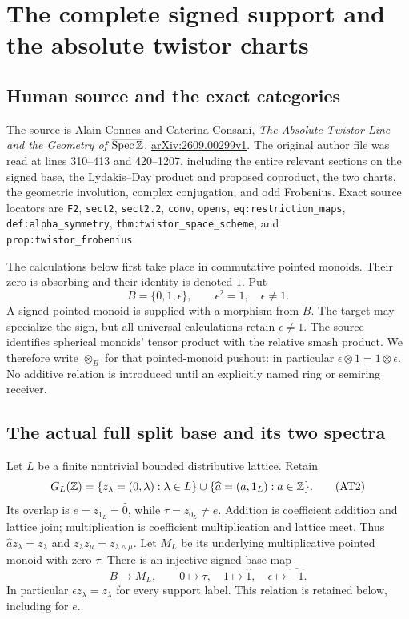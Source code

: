 \section{The complete signed support and the absolute twistor charts}


\subsection{Human source and the exact categories}

The source is Alain Connes and Caterina Consani,
\emph{The Absolute Twistor Line and the Geometry of
$\overline{\operatorname{Spec}\mathbb Z}$},
\href{https://arxiv.org/abs/2609.00299v1}{arXiv:2609.00299v1}.
The original author file  was read at lines
310--413 and 420--1207, including the entire relevant sections on
the signed base, the Lydakis--Day product and proposed coproduct,
the two charts, the geometric involution, complex conjugation,
and odd Frobenius. Exact source locators are
\texttt{F2}, \texttt{sect2}, \texttt{sect2.2}, \texttt{conv},
\texttt{opens}, \texttt{eq:restriction\_maps},
\texttt{def:alpha\_symmetry}, \texttt{thm:twistor\_space\_scheme},
and \texttt{prop:twistor\_frobenius}.

The calculations below first take place in commutative pointed
monoids. Their zero is absorbing and their identity is denoted $1$.
Put
\[
 B=\{0,1,\epsilon\},\qquad\epsilon^2=1,\quad\epsilon\ne1.
 \tag{AT1}\label{at:eq:signed-base}
\]
A signed pointed monoid is supplied with a morphism from $B$.
The target may specialize the sign, but all universal calculations
retain $\epsilon\ne1$. The source identifies spherical monoids'
tensor product with the relative smash product. We therefore write
$\otimes_B$ for that pointed-monoid pushout: in particular
$\epsilon\otimes1=1\otimes\epsilon$. No additive relation is
introduced until an explicitly named ring or semiring receiver.

\subsection{The actual full split base and its two spectra}

Let $L$ be a finite nontrivial bounded distributive lattice. Retain
\[
 G_L(\mathbb Z)=\{z_\lambda=(0,\lambda):\lambda\in L\}
       \cup\{\widehat a=(a,1_L):a\in\mathbb Z\}.
 \tag{AT2}\label{at:eq:full-semiring}
\]
Its overlap is $e=z_{1_L}=\widehat0$, while
$\tau=z_{0_L}\ne e$. Addition is coefficient addition and lattice
join; multiplication is coefficient multiplication and lattice
meet. Thus $\widehat a z_\lambda=z_\lambda$ and
$z_\lambda z_\mu=z_{\lambda\wedge\mu}$. Let $M_L$ be its
underlying multiplicative pointed monoid with zero $\tau$.
There is an injective signed-base map
\[
 B\longrightarrow M_L,
 \qquad 0\mapsto\tau,\quad1\mapsto\widehat1,
 \quad\epsilon\mapsto\widehat{-1}.
 \tag{AT3}\label{at:eq:base-map}
\]
In particular $\epsilon z_\lambda=z_\lambda$ for every support
label. This relation is retained below, including for $e$.

